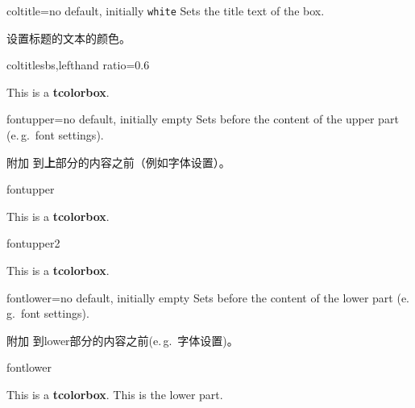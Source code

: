 \begin{docTcbKey}{coltitle}{=}{no default, initially \texttt{white}}
Sets the title text  of the box.

设置标题的文本的颜色。
\begin{exdispExample*}{coltitle}{sbs,lefthand ratio=0.6}
\begin{tcolorbox}[coltitle=red!75!black,
colbacktitle=black!10!white,title=Test]
This is a \textbf{tcolorbox}.
\end{tcolorbox}
\end{exdispExample*}
\end{docTcbKey}






\begin{docTcbKey}{fontupper}{=}{no default, initially empty}
Sets  before the content of the upper part (e.\,g.\ font settings).

附加  到{\bf 上}部分的内容之前（例如字体设置）。

\begin{exdispExample}{fontupper}
\begin{tcolorbox}[fontupper=Hello!~\sffamily]
This is a \textbf{tcolorbox}.
\end{tcolorbox}
\end{exdispExample}
\begin{exdispExample}{fontupper2}
\begin{tcolorbox}[fontupper=Hello!~]
This is a \textbf{tcolorbox}.
\end{tcolorbox}
\end{exdispExample}
\end{docTcbKey}


\begin{docTcbKey}{fontlower}{=}{no default, initially empty}
Sets  before the content of the lower part (e.\,g.\ font settings).

附加  到lower部分的内容之前(e.\,g.\ 字体设置)。
\begin{exdispExample}{fontlower}
\begin{tcolorbox}[fontlower=\sffamily\bfseries]
This is a \textbf{tcolorbox}.
\tcblower
This is the lower part.
\end{tcolorbox}
\end{exdispExample}
\end{docTcbKey}



